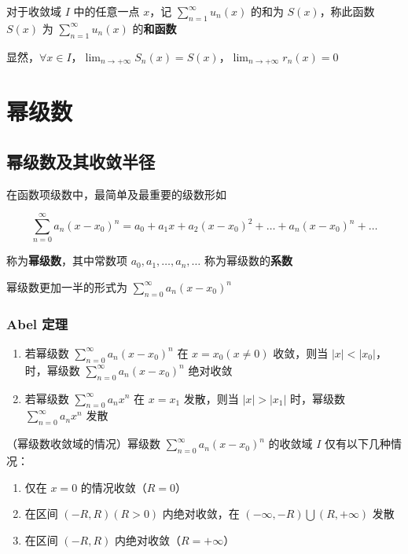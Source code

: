 \documentclass[lang = zh , final , oneside , openany , titlepage , zihao = -4 , linespread = 1.3 , baselineskip = false , cjk-font = windows , text-font = newtx , math-font = newtx]{sjtureport}
\begin{document}
\begin{definition}
\begin{definition}
    对于收敛域 \(I\) 中的任意一点 \(x\)，记
\(\displaystyle \sum_{n=1}^\infty u_n(x)\) 的和为 \(S(x)\)，称此函数
\(S(x)\) 为 \(\displaystyle \sum_{n=1}^\infty u_n(x)\) 的\textbf{和函数}

显然，\(\forall x\in I\)，\(\displaystyle \lim_{n\to +\infty}S_n(x) =S(x)\)，\(\displaystyle \lim_{n\to +\infty}r_n(x)=0\)
\end{definition}

\section{幂级数}

\subsection{幂级数及其收敛半径}

在函数项级数中，最简单及最重要的级数形如

\[\sum_{n=0}^\infty a_n(x-x_0)^n = a_0 +a_1x + a_2(x-x_0)^2 + \ldots + a_n(x-x_0)^n + \ldots\]

称为\textbf{幂级数}，其中常数项 \(a_0,a_1,\ldots,a_n,\ldots\)
称为幂级数的\textbf{系数}

幂级数更加一半的形式为 \(\displaystyle \sum_{n=0}^\infty a_n(x-x_0)^n\)

\subsubsection{Abel 定理}

\begin{enumerate}
\item
  若幂级数 \(\displaystyle \sum_{n=0}^\infty a_n(x-x_0)^n\) 在
  \(x=x_0(x\neq 0)\) 收敛，则当
  \(\vert x \vert <\vert x_0\vert\)，时，幂级数
  \(\displaystyle \sum_{n=0}^\infty a_n(x-x_0)^n\) 绝对收敛
\item
  若幂级数 \(\displaystyle \sum_{n=0}^\infty a_nx^n\) 在 \(x=x_1\)
  发散，则当 \(\vert x \vert >\vert x_1\vert\) 时，幂级数
  \(\displaystyle \sum_{n=0}^\infty a_nx^n\) 发散
\end{enumerate}

\begin{lemma}
    （幂级数收敛域的情况）幂级数 \(\displaystyle \sum_{n=0}^\infty a_n(x-x_0)^n\) 的收敛域 \(I\)
仅有以下几种情况：

\begin{enumerate}
\def\labelenumi{\arabic{enumi}.}
\item
  仅在 \(x=0\) 的情况收敛（\(R=0\)）
\item
  在区间 \((-R,R)(R>0)\) 内绝对收敛，在
  \((-\infty ,-R)\bigcup(R,+\infty)\) 发散
\item
  在区间 \((-R,R)\) 内绝对收敛（\(R=+\infty\)）
\end{enumerate}
\end{lemma}


\end{definition}
\end{document}
